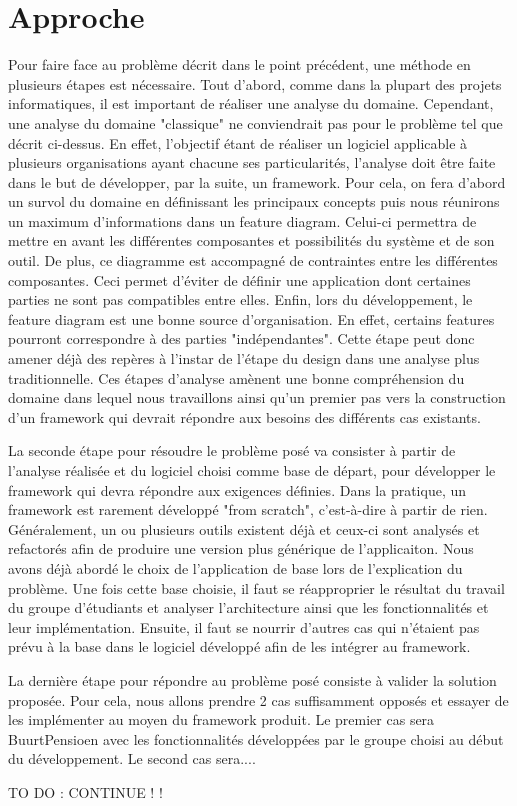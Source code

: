 \section{Approche}

Pour faire face au problème décrit dans le point précédent,  une méthode en plusieurs étapes est nécessaire.  
Tout d'abord,  comme dans la plupart des projets informatiques,  il est important de réaliser une analyse du domaine.  Cependant,  une analyse du domaine "classique" ne conviendrait pas pour le problème tel que décrit ci-dessus.  En effet,  l'objectif étant de réaliser un logiciel applicable à plusieurs organisations ayant chacune ses particularités,  l'analyse doit être faite dans le but de développer,  par la suite,  un framework.  Pour cela,  on fera d'abord un survol du domaine en définissant les principaux concepts puis  nous réunirons un maximum d'informations dans un feature diagram.  Celui-ci permettra de mettre en avant les différentes composantes et possibilités du système et de son outil.  De plus,  ce diagramme est accompagné de contraintes entre les différentes composantes.  Ceci permet d'éviter de définir une application dont certaines parties ne sont pas compatibles entre elles.  Enfin,  lors du développement,  le feature diagram est une bonne source d'organisation.  En effet,  certains features pourront correspondre à des parties "indépendantes".  Cette étape peut donc amener déjà des repères à l'instar de l'étape du design dans une analyse plus traditionnelle.
Ces étapes d'analyse amènent une bonne compréhension du domaine dans lequel nous travaillons ainsi qu'un premier pas vers la construction d'un framework qui devrait répondre aux besoins des différents cas existants.  

La seconde étape pour résoudre le problème posé va consister à partir de l'analyse réalisée et du logiciel choisi comme base de départ,  pour développer le framework qui devra répondre aux exigences définies.  Dans la pratique,  un framework est rarement développé "from scratch",  c'est-à-dire à partir de rien.  Généralement,  un ou plusieurs outils existent déjà et ceux-ci sont analysés et refactorés afin de produire une version plus générique de l'applicaiton.  Nous avons déjà abordé le choix de l'application de base lors de l'explication du problème.  Une fois cette base choisie,  il faut se réapproprier le résultat du travail du groupe d'étudiants et analyser l'architecture ainsi que les fonctionnalités et leur implémentation.  Ensuite,  il faut se nourrir d'autres cas qui n'étaient pas prévu à la base dans le logiciel développé afin de les intégrer au framework.

La dernière étape pour répondre au problème posé consiste à valider la solution proposée.  Pour cela,  nous allons prendre 2 cas suffisamment opposés et essayer de les implémenter au moyen du framework produit.  Le premier cas sera BuurtPensioen avec les fonctionnalités développées par le groupe choisi au début du développement.  Le second cas sera.... 

TO DO : CONTINUE ! !